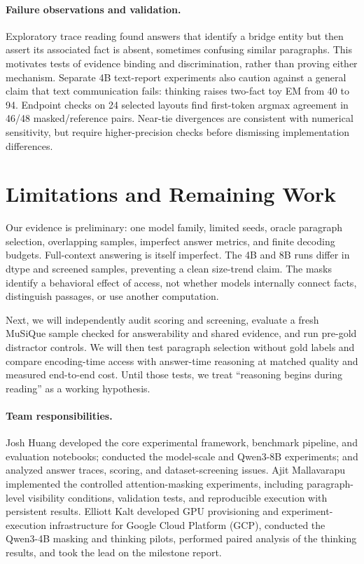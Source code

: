 \documentclass[sigconf,nonacm]{acmart}
\begin{document}
\paragraph{Failure observations and validation.}
Exploratory trace reading found answers that identify a bridge entity but
then assert its associated fact is absent, sometimes confusing similar
paragraphs. This motivates tests of evidence binding and discrimination,
rather than proving either mechanism. Separate 4B text-report experiments
also caution against a general claim that text communication fails: thinking
raises two-fact toy EM from 40 to 94. Endpoint checks on 24 selected layouts
find first-token argmax agreement in 46/48 masked/reference pairs.
Near-tie divergences are consistent with numerical sensitivity, but require
higher-precision checks before dismissing implementation differences.

\section{Limitations and Remaining Work}
Our evidence is preliminary: one model family, limited seeds, oracle
paragraph selection, overlapping samples, imperfect answer metrics, and
finite decoding budgets. Full-context answering is itself imperfect.
The 4B and 8B runs differ in dtype and screened samples, preventing a clean
size-trend claim. The masks identify a behavioral effect of access, not
whether models internally connect facts, distinguish passages, or use
another computation.

Next, we will independently audit scoring and screening, evaluate a fresh
MuSiQue sample checked for answerability and shared evidence, and run
pre-gold distractor controls. We will then test paragraph selection without
gold labels and compare encoding-time access with answer-time reasoning at
matched quality and measured end-to-end cost. Until those tests, we treat
``reasoning begins during reading'' as a working hypothesis.

\paragraph{Team responsibilities.}
Josh Huang developed the core experimental framework, benchmark pipeline,
and evaluation notebooks; conducted the model-scale and Qwen3-8B experiments;
and analyzed answer traces, scoring, and dataset-screening issues.
Ajit Mallavarapu implemented the controlled attention-masking experiments,
including paragraph-level visibility conditions, validation tests, and
reproducible execution with persistent results. Elliott Kalt developed GPU
provisioning and experiment-execution infrastructure for Google Cloud Platform
(GCP), conducted the Qwen3-4B masking and thinking pilots, performed paired
analysis of the thinking results, and took the lead on the milestone report.



\end{document}
